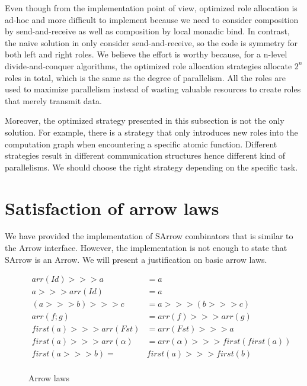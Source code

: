 Even though from the implementation point of view, optimized role allocation is ad-hoc and more difficult to implement because we need to consider composition by send-and-receive as well as composition by local monadic bind. In contrast, the naive solution in  only consider send-and-receive, so the code is symmetry for both left and right roles. We believe the effort is worthy because, for a n-level divide-and-conquer algorithms, the optimized role allocation strategies allocate $2^n$ roles in total, which is the same as the degree of parallelism. All the roles are used to maximize parallelism instead of wasting valuable resources to create roles that merely transmit data.

Moreover, the optimized strategy presented in this subsection is not the only solution. For example, there is a strategy that only introduces new roles into the computation graph when encountering a specific atomic function. Different strategies result in different communication structures hence different kind of parallelisms. We should choose the right strategy depending on the specific task.
\section{Satisfaction of arrow laws}
We have provided the implementation of SArrow combinators that is similar to the Arrow interface. However, the implementation is not enough to state that SArrow is an Arrow. We will present a justification on basic arrow laws.
\begin{figure}[ht]
    \begin{align*}
        arr(Id) >>> a &= a \tag{1}\\
        a >>> arr(Id) &= a \tag{2}\\
        (a >>> b) >>> c &= a >>> (b >>> c) \tag{3}\\
        arr(f;g) &= arr(f) >>> arr(g) \tag{4}\\
        first(a) >>> arr(Fst) &= arr(Fst) >>> a \tag{5}\\
        first(a) >>> arr(\alpha) &= arr(\alpha) >>> first(first(a)) \tag{6}\\
        first(a >>> b) =& first(a) >>> first(b) \tag{7}\\
    \end{align*}
    \caption{Arrow laws \cite{atkeyWhatCategoricalModel2011}}
    \label{arrow:tab:law}
\end{figure}


